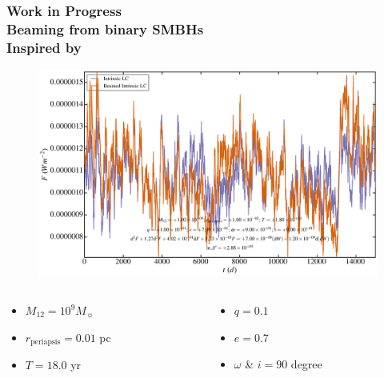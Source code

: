 \documentclass[hyperref={pdfpagelabels=false}]{beamer}
\begin{document}
\begin{frame}
\frametitle{Work in Progress\\Beaming from binary SMBHs\\{\tiny Inspired by \citet*{binarySMBHNature15}}}
        \begin{figure}
          \includegraphics[scale=0.05]{images/beamedLC.jpg}
        \end{figure}
  \begin{columns}
  \centering
    \begin{column}{0.5\textwidth}
      \begin{itemize}
        \item $M_{12} = 10^{9} M_{\sun}$
        \item $r_{\mathrm{periapsis}} = 0.01$ pc
        \item $T = 18.0$ yr
      \end{itemize}
    \end{column}
    \begin{column}{0.5\textwidth}
      \begin{itemize}
        \item $q = 0.1$
        \item $e = 0.7$
        \item $\omega$ \& $i = 90$ degree
      \end{itemize}
    \end{column}
  \end{columns}
\end{frame}
\end{document}
